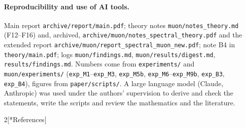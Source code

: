 \documentclass[10pt]{article}
\makeatletter
\renewcommand\section{\@startsection{section}{1}{\z@}{-2.4ex \@plus -0.6ex \@minus -.2ex}{1.2ex \@plus .2ex}{\normalfont\large\bfseries}}
\theoremstyle{remark}
\makeatother
\begin{document}
\paragraph{Reproducibility and use of AI tools.} Main report \nolinkurl{archive/report/main.pdf}; theory notes
\nolinkurl{muon/notes_theory.md} (F12--F16) and, archived, \nolinkurl{archive/muon/notes_spectral_theory.pdf} and the
extended report \nolinkurl{archive/muon/report_spectral_muon_new.pdf}; note B4 in \nolinkurl{theory/main.pdf}; logs
\nolinkurl{muon/findings.md}, \nolinkurl{muon/results/digest.md}, \nolinkurl{results/findings.md}. Numbers come from
\nolinkurl{experiments/} and \nolinkurl{muon/experiments/} (\texttt{exp\_M1}--\texttt{exp\_M3}, \texttt{exp\_M5b},
\texttt{exp\_M6}--\texttt{exp\_M9b}, \texttt{exp\_B3}, \texttt{exp\_B4}), figures from \nolinkurl{paper/scripts/}. A large
language model (Claude, Anthropic) was used under the authors' supervision to derive and check the statements, write the
scripts and review the mathematics and the literature.

{\footnotesize\setlength{\columnsep}{1.6em}
\begin{multicols}{2}[\section*{References}]
\sloppy


\end{multicols}
}
\end{document}

